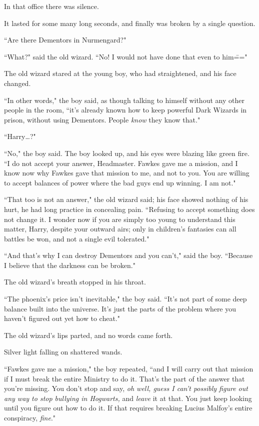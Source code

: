 In that office there was silence.

It lasted for some many long seconds, and finally was broken by a single question.

``Are there Dementors in Nurmengard?"

``What?" said the old wizard. ``No! I would not have done that even to him\==="

\later

The old wizard stared at the young boy, who had straightened, and his face changed.

``In other words," the boy said, as though talking to himself without any other people in the room, ``it's already known how to keep powerful Dark Wizards in prison, without using Dementors. People \emph{know} they know that."

``Harry{\ldots}?"

``No," the boy said. The boy looked up, and his eyes were blazing like green fire. ``I do not accept your answer, Headmaster. Fawkes gave me a mission, and I know now why Fawkes gave that mission to me, and not to you. You are willing to accept balances of power where the bad guys end up winning. I am not."

``That too is not an answer," the old wizard said; his face showed nothing of his hurt, he had long practice in concealing pain. ``Refusing to accept something does not change it. I wonder now if you are simply too young to understand this matter, Harry, despite your outward airs; only in children's fantasies can all battles be won, and not a single evil tolerated."

``And that's why I can destroy Dementors and you can't," said the boy. ``Because I believe that the darkness can be broken."

The old wizard's breath stopped in his throat.

``The phoenix's price isn't inevitable," the boy said. ``It's not part of some deep balance built into the universe. It's just the parts of the problem where you haven't figured out yet how to cheat."

The old wizard's lips parted, and no words came forth.

Silver light falling on shattered wands.

``Fawkes gave me a mission," the boy repeated, ``and I will carry out that mission if I must break the entire Ministry to do it. That's the part of the answer that you're missing. You don't stop and say, \emph{oh well, guess I can't possibly figure out any way to stop bullying in Hogwarts,} and \emph{leave} it at that. You just keep looking until you figure out how to do it. If that requires breaking Lucius Malfoy's entire conspiracy, \emph{fine}."


